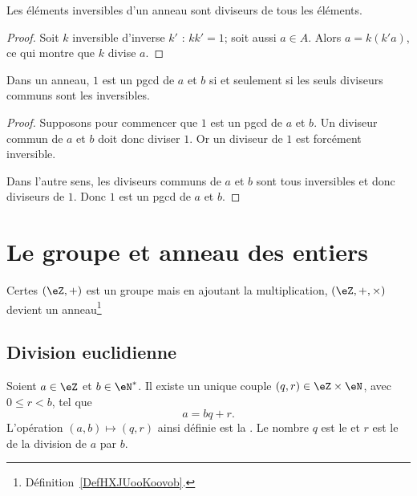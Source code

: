 \begin{lemma}
    Les éléments inversibles d'un anneau sont diviseurs de tous les éléments.
\end{lemma}

\begin{proof}
    Soit \( k\) inversible d'inverse \( k'\) : \( kk'=1\); soit aussi \( a\in A\). Alors \( a=k(k'a)\), ce qui montre que \( k\) divise \( a\).
\end{proof}

\begin{lemma}
    Dans un anneau, \( 1\) est un pgcd de \( a\) et \( b\) si et seulement si les seuls diviseurs communs sont les inversibles.
\end{lemma}

\begin{proof}
    Supposons pour commencer que \( 1\) est un pgcd de \( a\) et \( b\). Un diviseur commun de \( a\) et \( b\) doit donc diviser \( 1\). Or un diviseur de \( 1\) est forcément inversible.

    Dans l'autre sens, les diviseurs communs de \( a\) et \( b\) sont tous inversibles et donc diviseurs de \( 1\). Donc \( 1\) est un pgcd de \( a\) et \( b\).
\end{proof}

\section{Le groupe et anneau des entiers}

Certes \( (\eZ,+)\) est un groupe mais en ajoutant la multiplication, \( (\eZ,+,\times)\) devient un anneau\footnote{Définition~\ref{DefHXJUooKoovob}.} 

\subsection{Division euclidienne}

\begin{theoremDef}     \label{ThoDivisEuclide}
    Soient \( a\in\eZ\) et \( b\in\eN^*\). Il existe un unique couple \( (q,r)\in\eZ\times\eN\), avec \( 0\leq r<b\), tel que
    \begin{equation}
        a=bq+r.
    \end{equation}
    L'opération \( (a,b)\mapsto(q,r)\) ainsi définie est la . Le nombre \( q\) est le  et \( r\) est le  de la division de \( a\) par \( b\).
\end{theoremDef}

